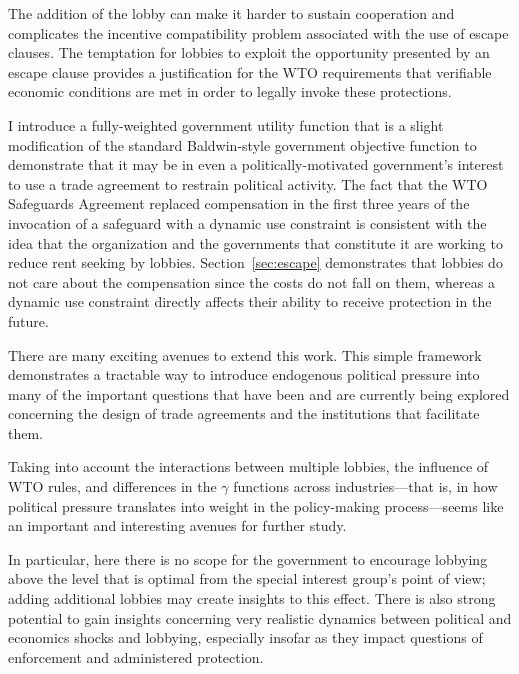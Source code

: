 \documentclass[12pt]{article}
\newcommand{\ga}{\gamma}
\begin{document}
The addition of the lobby can make it harder to sustain cooperation and complicates the incentive compatibility problem associated with the use of escape clauses. The temptation for lobbies to exploit the opportunity presented by an escape clause provides a justification for the WTO requirements that verifiable economic conditions are met in order to legally invoke these protections.

I introduce a fully-weighted government utility function that is a slight modification of the standard Baldwin-style government objective function to demonstrate that it may be in even a politically-motivated government's interest to use a trade agreement to restrain political activity. The fact that the WTO Safeguards Agreement replaced compensation in the first three years of the invocation of a safeguard with a dynamic use constraint is consistent with the idea that the organization and the governments that constitute it are working to reduce rent seeking by lobbies. Section~\ref{sec:escape} demonstrates that lobbies do not care about the compensation since the costs do not fall on them, whereas a dynamic use constraint directly affects their ability to receive protection in the future.

There are many exciting avenues to extend this work. This simple framework demonstrates a tractable way to introduce endogenous political pressure into many of the important questions that have been and are currently being explored concerning the design of trade agreements and the institutions that facilitate them.


Taking into account the interactions between multiple lobbies, the influence of WTO rules, and differences in the $\ga$ functions across industries---that is, in how political pressure translates into weight in the policy-making process---seems like an important and interesting avenues for further study.

In particular, here there is no scope for the government to encourage lobbying above the level that is optimal from the special interest group's point of view; adding additional lobbies may create insights to this effect. There is also strong potential to gain insights concerning very realistic dynamics between political and economics shocks and lobbying, especially insofar as they impact questions of enforcement and administered protection.
\end{document}
